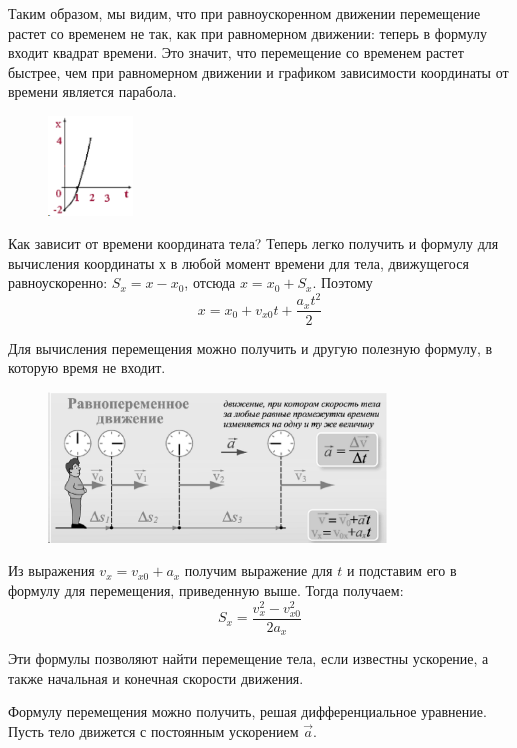 \documentclass[a5paper, 10pt]{diss_4}
\renewcommand{\'}{\,'}
\begin{document}
  Таким образом, мы видим, что при равноускоренном движении перемещение
растет со временем не так, как при равномерном движении: теперь в формулу
входит квадрат времени. Это значит, что перемещение со временем растет быстрее,
чем при равномерном движении и графиком зависимости координаты от времени
является парабола.

\begin{figure}
\includegraphics[width=0.2\textwidth]{img/eps13.eps}
\caption{}
\label{fig13}
\end{figure}


  Как зависит от времени координата тела? Теперь легко получить и формулу
для вычисления координаты $х$ в любой момент времени для тела, движущегося
равноускоренно: $S_x=x-x_0$, отсюда $x=x_0+S_x$. Поэтому
\[x=x_0+v_{x0}t+\frac{a_x t^2}{2}\]

  Для вычисления перемещения можно получить и другую полезную формулу, в
которую время не входит.
\begin{figure}
\begin{center}
  \includegraphics[width=0.8\textwidth]{img/img14.eps}\\
  \caption{}\label{img14}
\end{center}
\end{figure}
Из выражения $v_x=v_{x0}+a_x$ получим выражение для
$t$ и подставим его в формулу для перемещения, приведенную выше. Тогда
получаем:
\[S_x=\frac{v_x^2-v_{x0}^2}{2a_x}\]


  Эти формулы позволяют найти перемещение тела, если известны ускорение,
а также начальная и конечная скорости движения.

  Формулу перемещения можно получить, решая дифференциальное уравнение.
Пусть тело движется с постоянным ускорением $\vec{a}$.
\end{document}
